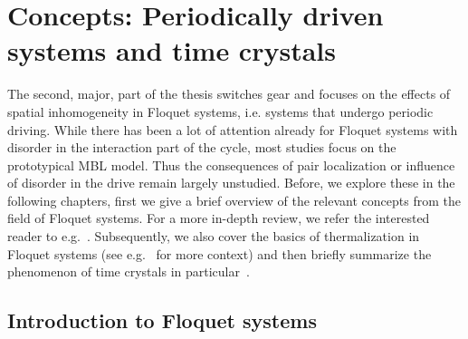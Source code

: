 \chapter{Concepts: Periodically driven systems and time crystals}\label{ch:introduction-floquet}

The second, major, part of the thesis switches gear and focuses on the effects of spatial inhomogeneity in Floquet systems, i.e. systems that undergo periodic driving. While there has been a lot of attention already for Floquet systems with disorder in the interaction part of the cycle, most studies focus on the prototypical MBL model. Thus the consequences of pair localization or influence of disorder in the drive remain largely unstudied. Before, we explore these in the following chapters, first we give a brief overview of the relevant concepts from the field of Floquet systems. For a more in-depth review, we refer the interested reader to e.g.~\cite{eckardtColloquiumAtomicQuantum2017}. Subsequently, we also cover the basics of thermalization in Floquet systems (see e.g.~\cite{moriThermalizationPrethermalizationIsolated2018} for more context) and then briefly summarize the phenomenon of time crystals in particular~\cite{elseFloquetTimeCrystals2016,khemaniBriefHistoryTime2019,elseDiscreteTimeCrystals2020a}.



\section{Introduction to Floquet systems}

